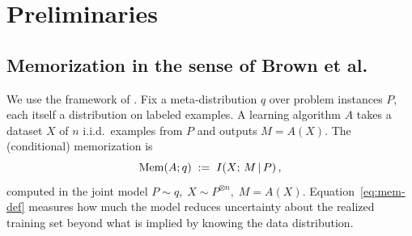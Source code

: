 \section{Preliminaries}\label{sec:prelim}

\subsection{Memorization in the sense of Brown et al.}\label{sec:mem-def}
We use the framework of \citet[\S1]{Brown2021Memorization}. Fix a meta-distribution \(q\) over problem instances \(P\), each itself a distribution on labeled examples. A learning algorithm \(A\) takes a dataset \(X\) of \(n\) i.i.d.\ examples from \(P\) and outputs \(M=A(X)\). The (conditional) memorization is
\begin{equation}\label{eq:mem-def}
\mathrm{Mem}(A;q) \;:=\; I\!\left(X;\,M\,\middle|\,P\right),
\end{equation}
computed in the joint model \(P\sim q,\;X\sim P^{\otimes n},\;M=A(X)\). Equation~\eqref{eq:mem-def} measures how much the model reduces uncertainty about the realized training set beyond what is implied by knowing the data distribution.

